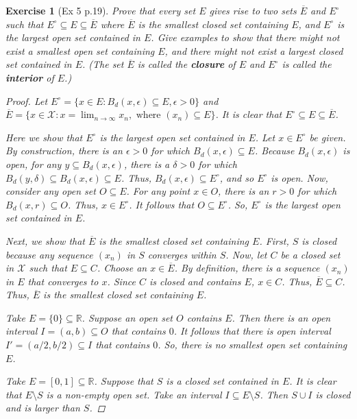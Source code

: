 \documentclass[11pt]{article}
\newtheorem{exercise}{Exercise}
\newcommand{\R}{\mathbb{R}}
\begin{document}
\begin{exercise}[Ex 5 p.19]
	Prove that every set $E$ gives rise to two sets $\overline{E}$ and $E^\circ$ such that $E^\circ \subseteq E   \subseteq \overline{E}$ where $\overline{E}$ is the smallest closed set containing $E$, and $E^\circ$ is the largest open set contained in $E$. Give examples to show that there might not exist a smallest open set containing $E$, and there might not exist a largest closed
	set contained in $E$. (The set $\overline{E}$ is called the \textbf{closure} of $E$ and $E^\circ$ is called the \textbf{interior} of $E$.)
	
	\begin{proof}
		Let $E^\circ = \{ x\in E : B_d(x,\epsilon) \subseteq E, \epsilon > 0 \}$ and $\overline{E} = \{ x\in \mathcal{X} : x = \lim_{n\to \infty} x_n, \mbox{ where } (x_n)\subseteq E \}$. It is clear that $E^\circ \subseteq E \subseteq \overline{E}$. 
		
		Here we show that $E^\circ$ is the largest open set contained in $E$. Let $x\in E^\circ$ be given. By construction, there is an $\epsilon > 0$ for which $B_d(x,\epsilon) \subseteq E$. Because $B_d(x,\epsilon)$ is open, for any $y  \subseteq B_d(x,\epsilon)$, there is a $\delta > 0$ for which $B_d(y,\delta) \subseteq B_d(x,\epsilon) \subseteq E$. Thus, $B_d(x,\epsilon) \subseteq E^\circ$, and so $E^\circ$ is open. Now, consider any open set $O \subseteq E$. For any point $x\in O$, there is an $r > 0$ for which $B_d(x,r) \subseteq O$. Thus, $x\in E^\circ$. It follows that $O\subseteq E^\circ$. So, $E^\circ$ is the largest open set contained in $E$. 
		
		Next, we show that $\overline{E}$ is the smallest closed set containing $E$. First, $S$ is closed because any sequence $(x_n)$ in $S$ converges within $S$. Now, let $C$ be a closed set in $\mathcal{X}$ such that $E \subseteq C$. Choose an $x\in \overline{E}$. By definition, there is a sequence $(x_n)$ in $E$ that converges to $x$. Since $C$ is closed and contains $E$, $x\in C$. Thus, $\overline{E} \subseteq C$. Thus, $\overline{E}$ is the smallest closed set containing $E$. 
		
		Take $E = \{0\} \subseteq \R$. Suppose an open set $O$ contains $E$. Then there is an open interval $I = (a,b)\subseteq O$ that contains $0$. It follows that there is open interval $I' = (a/2,b/2)\subseteq I$ that  contains $0$. So, there is no smallest open set containing $E$. 
		
		Take $E = [0,1]\subseteq \R$. Suppose that $S$ is a closed set contained in $E$. It is clear that $E\setminus S$ is a non-empty open set. Take an interval $I \subseteq E\setminus S$. Then $S\cup I$ is closed and is larger than $S$. 
	\end{proof}
\end{exercise}
\end{document}
